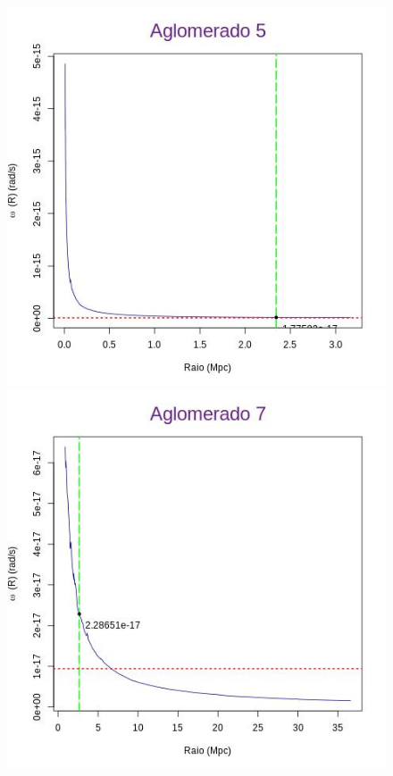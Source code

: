 \begin{anexosenv}
\begin{figure}[H]
\begin{center}
\includegraphics[scale=.3]{04-figuras/selec20/perfil05}
\includegraphics[scale=.3]{04-figuras/selec20/perfil07}\hfill

\end{center}
\end{figure}
\end{anexosenv}
